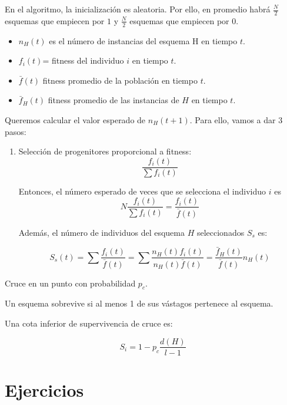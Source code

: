 \documentclass{apuntes}
\begin{document}
En el algoritmo, la inicialización es aleatoria. Por ello, en promedio habrá $\frac{N}{2}$ esquemas que empiecen por $1$ y $\frac{N}{2}$ esquemas que empiecen por $0$.


\begin{defn}[Funciones de $t$]
\begin{itemize}
	\item $n_H(t)$ es el número de instancias del esquema H en tiempo $t$.
	\item $f_i(t)$= fitness del individuo $i$ en tiempo $t$.
	\item $\bar{f}(t)$ fitness promedio de la población en tiempo $t$.
	\item $\bar{f}_H(t)$ fitness promedio de las instancias de $H$ en tiempo $t$.
\end{itemize}
\end{defn}

Queremos calcular el valor esperado de $n_H(t+1)$. Para ello, vamos a dar 3 pasos:

\begin{enumerate}
	\item Selección de progenitores proporcional a fitness: \[\frac{f_i(t)}{\sum f_i(t)}\]

	Entonces, el número esperado de veces que se selecciona el individuo $i$ es \[N\frac{f_i(t)}{\sum f_i(t)} = \frac{f_i(t)}{\bar{f}(t)} \]

	Además, el número de individuos del esquema $H$ seleccionados $S_s$ es:

	\[S_s(t) = \sum \frac{f_i(t)}{\bar{f}(t)} = \sum \frac{n_H(t)f_i(t)}{n_H(t)\bar{f}(t)} = \frac{\bar{f}_H(t)}{\bar{f}(t)}n_H(t)\]
\end{enumerate}


\begin{example}
Cruce en un punto con probabilidad $p_c$.

Un esquema sobrevive si al menos 1 de sus vástagos pertenece al esquema.

 Una cota inferior de supervivencia de cruce es:

 \[ S_i = 1 - p_c\frac{d(H)}{l-1}\]


\end{example}
\appendix


\chapter{Ejercicios}

\printindex
\end{document}

